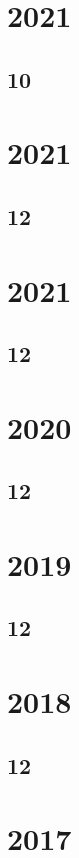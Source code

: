 \section{2021}
\subsection{10}

\section{2021}
\subsection{12}

\section{2021}
\subsection{12}

\section{2020}
\subsection{12}

\section{2019}
\subsection{12}





\section{2018}
\subsection{12}




\section{2017}
